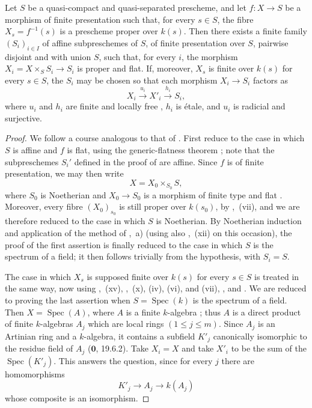 \begin{proposition}[17.16.6]
\label{IV.17.16.6}
Let $S$ be a quasi-compact and quasi-separated prescheme, and let $f:X\to S$ be a morphism of finite presentation such that, for every $s\in S$, the fibre $X_s=f^{-1}(s)$ is a prescheme proper over $k(s)$.
Then there exists a finite family $(S_i)_{i\in I}$ of affine subpreschemes of $S$, of finite presentation over $S$, pairwise disjoint and with union $S$, such that, for every $i$, the morphism $X_i=X\times_S S_i\to S_i$ is proper and flat.
If, moreover, $X_s$ is finite over $k(s)$ for every $s\in S$, the $S_i$ may be chosen so that each morphism $X_i\to S_i$ factors as
\[
 X_i \xrightarrow{u_i} X'_i \xrightarrow{h_i} S_i,
\]
where $u_i$ and $h_i$ are finite and locally free , $h_i$ is \'etale, and $u_i$ is radicial and surjective.
\end{proposition}

\begin{proof}
We follow a course analogous to that of .  First reduce to the case in which $S$ is affine and $f$ is flat, using the generic-flatness theorem ; note that the subpreschemes $S_i'$ defined in the proof of  are affine.  Since $f$ is of finite presentation, we may then write
\[
 X=X_0\times_{S_0}S,
\]
where $S_0$ is Noetherian and $X_0\to S_0$ is a morphism of finite type and flat .  Moreover, every fibre $(X_0)_{s_0}$ is still proper over $k(s_0)$, by ,~(vii), and we are therefore reduced to the case in which $S$ is Noetherian.  By Noetherian induction and application of the method of ,~a) (using also ,~(xii) on this occasion), the proof of the first assertion is finally reduced to the case in which $S$ is the spectrum of a field; it then follows trivially from the hypothesis, with $S_i=S$.

The case in which $X_s$ is supposed finite over $k(s)$ for every $s\in S$ is treated in the same way, now using ,~(xv), ,~(x), (iv), (vi), and (vii), , and .  We are reduced to proving the last assertion when $S=\operatorname{Spec}(k)$ is the spectrum of a field.  Then $X=\operatorname{Spec}(A)$, where $A$ is a finite $k$-algebra ; thus $A$ is a direct product of finite $k$-algebras $A_j$ which are local rings $(1\leq j\leq m)$.  Since $A_j$ is an Artinian ring and a
$k$-algebra, it contains a subfield $K'_j$ canonically isomorphic to the residue field of $A_j$ ($\mathbf{0}$, 19.6.2).  Take $X_i=X$ and take $X'_i$ to be the sum of the $\operatorname{Spec}(K'_j)$.  This answers the question, since for every $j$ there are homomorphisms
\[
 K'_j\longrightarrow A_j\longrightarrow k(A_j)
\]
whose composite is an isomorphism.
\end{proof}
